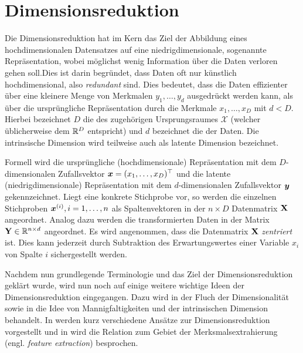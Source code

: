 \chapter{Dimensionsreduktion}
\label{ch:Dimensionsreduktion}

Die Dimensionsreduktion hat im Kern das Ziel der Abbildung eines hochdimensionalen Datensatzes auf
eine niedrigdimensionale, sogenannte  Repräsentation, wobei möglichst wenig
Information über die Daten verloren gehen soll.\addref Dies ist darin begründet, dass Daten oft nur
künstlich hochdimensional, also \textit{redundant} sind. Dies bedeutet, dass die Daten effizienter
über eine kleinere Menge von Merkmalen $y_1,\ldots,y_d$ ausgedrückt werden kann, als über die
ursprüngliche Repräsentation durch die Merkmale $x_1,\ldots,x_D$ mit $d < D$. Hierbei bezeichnet
$D$ die  des zugehörigen Ursprungsraumes $\mathcal{X}$ (welcher
üblicherweise dem $\mathbb{R}^D$ entspricht) und $d$ bezeichnet die  der
Daten. Die intrinsische Dimension wird teilweise auch als latente Dimension bezeichnet.

Formell wird die ursprüngliche (hochdimensionale) Repräsentation mit dem $D$-dimensionalen
Zufallsvektor $\bm{x} = (x_1, \ldots, x_D)^\top$ und die latente (niedrigdimensionale)
Repräsentation mit dem $d$-dimensionalen Zufallsvektor $\bm{y}$ gekennzeichnet. Liegt eine
konkrete Stichprobe vor, so werden die einzelnen Stichproben $\bm{x}^{(i)}, i = 1,\ldots,n$ als
Spaltenvektoren in der $n \times D$ Datenmatrix $\mathbf{X}$ angeordnet. Analog dazu werden die
transformierten Daten in der Matrix $\mathbf{Y} \in \mathbb{R}^{n \times d}$ angeordnet. Es wird
angenommen, dass die Datenmatrix $\mathbf{X}$ \textit{zentriert} ist. Dies kann jederzeit durch
Subtraktion des Erwartungswertes einer Variable $x_i$ von Spalte $i$ sichergestellt werden.

Nachdem nun grundlegende Terminologie und das Ziel der Dimensionsreduktion geklärt wurde, wird nun
noch auf einige weitere wichtige Ideen der Dimensionsreduktion eingegangen. Dazu wird in
 der Fluch der Dimensionalität sowie in
 die Idee von Mannigfaltigkeiten und
der intrinsischen Dimension behandelt. In  werden kurz
verschiedene Ansätze zur Dimensionsreduktion vorgestellt und in
 wird die Relation zum Gebiet der
Merksmalsextrahierung (engl. \textit{feature extraction}) besprochen.

